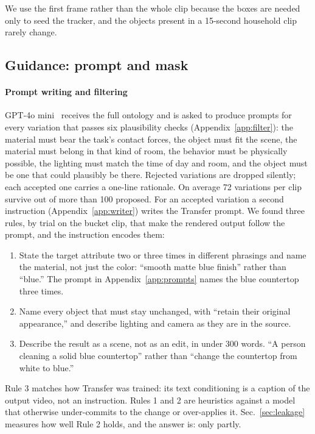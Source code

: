 We use the first frame rather than the whole clip because the boxes are needed only to seed the tracker, and the objects present in a 15-second household clip rarely change.

\subsection{Guidance: prompt and mask}
\label{sec:guidance}

\paragraph{Prompt writing and filtering}
GPT-4o mini~\cite{gpt4omini} receives the full ontology and is asked to produce prompts for every variation that passes six plausibility checks (Appendix~\ref{app:filter}): the material must bear the task's contact forces, the object must fit the scene, the material must belong in that kind of room, the behavior must be physically possible, the lighting must match the time of day and room, and the object must be one that could plausibly be there. Rejected variations are dropped silently; each accepted one carries a one-line rationale. On average 72 variations per clip survive out of more than 100 proposed. For an accepted variation a second instruction (Appendix~\ref{app:writer}) writes the Transfer prompt. We found three rules, by trial on the bucket clip, that make the rendered output follow the prompt, and the instruction encodes them:
\begin{enumerate}
    \item State the target attribute two or three times in different phrasings and name the material, not just the color: ``smooth matte blue finish'' rather than ``blue.'' The prompt in Appendix~\ref{app:prompts} names the blue countertop three times.
    \item Name every object that must stay unchanged, with ``retain their original appearance,'' and describe lighting and camera as they are in the source.
    \item Describe the result as a scene, not as an edit, in under 300 words. ``A person cleaning a solid blue countertop'' rather than ``change the countertop from white to blue.''
\end{enumerate}
Rule 3 matches how Transfer was trained: its text conditioning is a caption of the output video, not an instruction. Rules 1 and 2 are heuristics against a model that otherwise under-commits to the change or over-applies it. Sec.~\ref{sec:leakage} measures how well Rule 2 holds, and the answer is: only partly.

